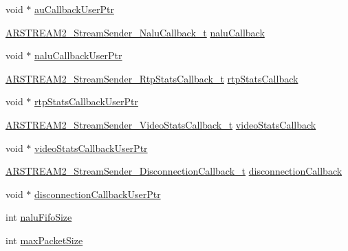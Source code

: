 \begin{DoxyCompactItemize}
\item 
void $\ast$ \hyperlink{struct_a_r_s_t_r_e_a_m2___stream_sender___config__t_a4c1b4f914690aed1e3865c9bb971a76f}{au\+Callback\+User\+Ptr}
\item 
\hyperlink{arstream2__stream__sender_8h_a10b715a92761c305ce7c41013f5c92dc}{A\+R\+S\+T\+R\+E\+A\+M2\+\_\+\+Stream\+Sender\+\_\+\+Nalu\+Callback\+\_\+t} \hyperlink{struct_a_r_s_t_r_e_a_m2___stream_sender___config__t_ac1f701c71abcc71c21a406b1cf85db81}{nalu\+Callback}
\item 
void $\ast$ \hyperlink{struct_a_r_s_t_r_e_a_m2___stream_sender___config__t_a835e282b611a84128385f25f3a3a5d1d}{nalu\+Callback\+User\+Ptr}
\item 
\hyperlink{arstream2__stream__sender_8h_a6f76d40043fc66e76936425512128f9c}{A\+R\+S\+T\+R\+E\+A\+M2\+\_\+\+Stream\+Sender\+\_\+\+Rtp\+Stats\+Callback\+\_\+t} \hyperlink{struct_a_r_s_t_r_e_a_m2___stream_sender___config__t_a5529f7d72f7dbcc379a529df0aa6df46}{rtp\+Stats\+Callback}
\item 
void $\ast$ \hyperlink{struct_a_r_s_t_r_e_a_m2___stream_sender___config__t_a9c9a5ffc2dcc99be984a7d771e9a754c}{rtp\+Stats\+Callback\+User\+Ptr}
\item 
\hyperlink{arstream2__stream__sender_8h_a96cc0f5bd4b3768679e4aeb7e250c652}{A\+R\+S\+T\+R\+E\+A\+M2\+\_\+\+Stream\+Sender\+\_\+\+Video\+Stats\+Callback\+\_\+t} \hyperlink{struct_a_r_s_t_r_e_a_m2___stream_sender___config__t_a8df6201776d9f2a6d39da012c67c4446}{video\+Stats\+Callback}
\item 
void $\ast$ \hyperlink{struct_a_r_s_t_r_e_a_m2___stream_sender___config__t_af43cc8f7c970b1cdf97594a1c074f9ac}{video\+Stats\+Callback\+User\+Ptr}
\item 
\hyperlink{arstream2__stream__sender_8h_ae0052a3484db5cba9b9f54f74983e743}{A\+R\+S\+T\+R\+E\+A\+M2\+\_\+\+Stream\+Sender\+\_\+\+Disconnection\+Callback\+\_\+t} \hyperlink{struct_a_r_s_t_r_e_a_m2___stream_sender___config__t_aee080fb594c69b7de7dc574cfc73ac83}{disconnection\+Callback}
\item 
void $\ast$ \hyperlink{struct_a_r_s_t_r_e_a_m2___stream_sender___config__t_a33ceabdb80f765ac9b8e69da83032644}{disconnection\+Callback\+User\+Ptr}
\item 
int \hyperlink{struct_a_r_s_t_r_e_a_m2___stream_sender___config__t_a9ed92118d2e8fa364c32b7f160ea3ea8}{nalu\+Fifo\+Size}
\item 
int \hyperlink{struct_a_r_s_t_r_e_a_m2___stream_sender___config__t_a1c902bac328a3ad7e498098d19953211}{max\+Packet\+Size}
\item 

\end{DoxyCompactItemize}
